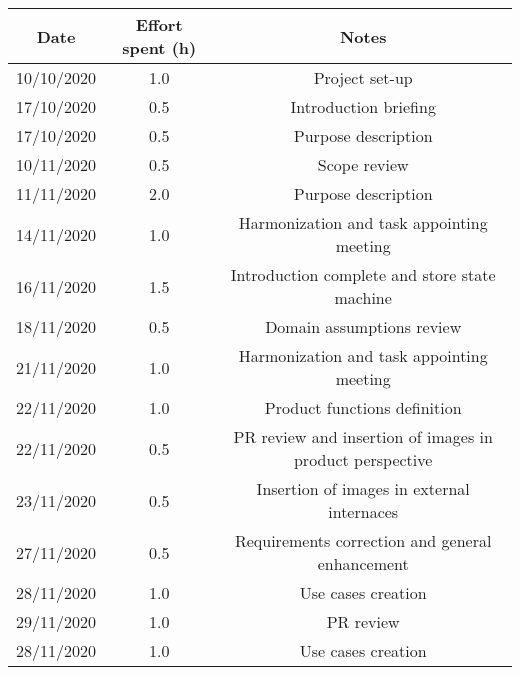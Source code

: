 \documentclass[../../main.tex]{subfiles}
\begin{document}
    \begin{center}
        \begin{tabular}{|c| |c| |c|} 
            \hline
            Date & Effort spent (h) & Notes\\ [0.5ex] 
            \hline\hline
            10/10/2020 & 1.0 & Project set-up\\ 
            17/10/2020 & 0.5 & Introduction briefing\\ 
            17/10/2020 & 0.5 & Purpose description\\ 
            10/11/2020 & 0.5 & Scope review\\
            11/11/2020 & 2.0 & Purpose description\\
            14/11/2020 & 1.0 & Harmonization and task appointing meeting\\
            16/11/2020 & 1.5 & Introduction complete and store state machine\\
            18/11/2020 & 0.5 & Domain assumptions review\\
            21/11/2020 & 1.0 & Harmonization and task appointing meeting\\
            22/11/2020 & 1.0 & Product functions definition\\
            22/11/2020 & 0.5 & PR review and insertion of images in product perspective\\
            23/11/2020 & 0.5 & Insertion of images in external internaces\\
            27/11/2020 & 0.5 & Requirements correction and general enhancement\\
            28/11/2020 & 1.0 & Use cases creation\\
            29/11/2020 & 1.0 & PR review\\
            28/11/2020 & 1.0 & Use cases creation\\
            \hline
        \end{tabular}
    \end{center}
\end{document}
